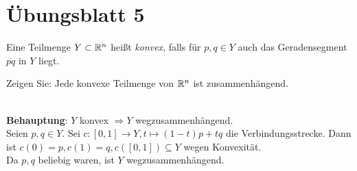 % 
\newpage
\setcounter{problemcounter}{0}
\section{Übungsblatt 5}

\begin{assignment}
  Eine Teilmenge \( Y \subset \mathbb{R}^n \) heißt \emph{konvex}, falls für \( p,q \in Y \) auch das Geradensegment \( \overline{pq} \) in \( Y \) liegt.
  
  Zeigen Sie: Jede konvexe Teilmenge von \( \mathbb{R}^n \) ist zusammenhängend.
\end{assignment}
\begin{solution}
  \  \\
  \textbf{Behauptung}: \( Y \) konvex \( \Rightarrow Y \) wegzusammenhängend. \\
  Seien \( p, q \in Y \). Sei \( c: [0,1] \to Y, t \mapsto (1-t)p +tq \) die Verbindungsstrecke.
  Dann ist \( c(0) = p, c(1) = q, c([0,1]) \subseteq Y \) wegen Konvexität. \\
  Da \( p,q \) beliebig waren, ist \( Y \) wegzusammenhängend. 
\end{solution}

